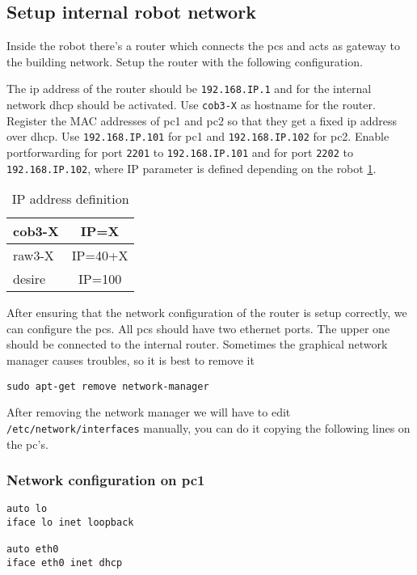 \subsection{Setup internal robot network}\label{sec:network}
Inside the robot there's a router which connects the pcs and acts as gateway to the building network. Setup the router with the following configuration. 

The ip address of the router should be \texttt{192.168.IP.1} and for the internal network dhcp should be activated. Use \texttt{cob3-X} as hostname for the router. Register the MAC addresses of pc1 and pc2 so that they get a fixed ip address over dhcp. Use \texttt{192.168.IP.101} for pc1 and \texttt{192.168.IP.102} for pc2. Enable portforwarding for port \texttt{2201} to \texttt{192.168.IP.101} and for port \texttt{2202} to \texttt{192.168.IP.102}, where IP parameter is defined depending on the robot \ref{IP_table}.

\begin{table}
\begin{center}
\begin{tabular}{ | l | c | }
  \hline
  cob3-X & IP=X \\
  \hline
  raw3-X & IP=40+X \\
  \hline
  desire & IP=100 \\
  \hline
\end{tabular}
\end{center}
\caption{IP address definition}
\label{IP_table}
\end{table}


After ensuring that the network configuration of the router is setup correctly, we can configure the pcs. All pcs should have two ethernet ports. The upper one should be connected to the internal router. Sometimes the graphical network manager causes troubles, so it is best to remove it
\begin{lstlisting}
sudo apt-get remove network-manager
\end{lstlisting}

After removing the network manager we will have to edit \texttt{/etc/network/interfaces} manually,  you can do it copying the following lines on the pc's.

\subsubsection{Network configuration on pc1}

\begin{lstlisting}
auto lo
iface lo inet loopback

auto eth0
iface eth0 inet dhcp
\end{lstlisting}


